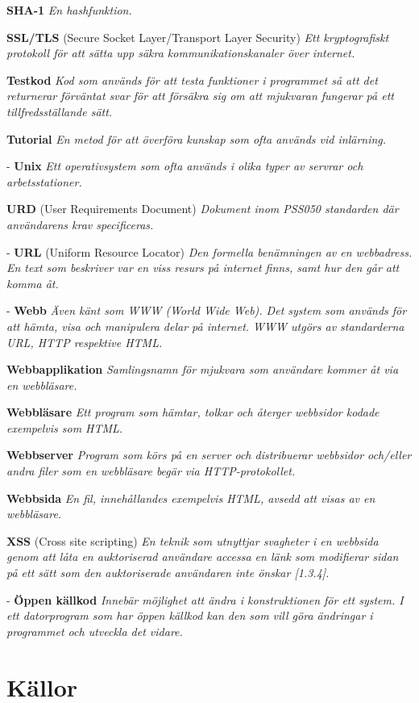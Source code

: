 \documentclass[a4paper, twoside, 11pt, titlepage]{article}
\begin{document}
\textbf{SHA-1} \emph{En hashfunktion.}

\textbf{SSL/TLS} (Secure Socket Layer/Transport Layer Security) \emph{Ett kryptografiskt protokoll för att sätta upp säkra kommunikationskanaler över internet.}

\textbf{Testkod} \emph{Kod som används för att testa funktioner i programmet så att det returnerar förväntat svar för att försäkra sig om att mjukvaran fungerar på ett tillfredsställande sätt.}

\textbf{Tutorial} \emph{En metod för att överföra kunskap som ofta används vid inlärning.}

- \textbf{Unix} \emph{Ett operativsystem som ofta används i olika typer av servrar och arbetsstationer.}

\textbf{URD} (User Requirements Document) \emph{Dokument inom PSS050 standarden där användarens krav specificeras.}

- \textbf{URL} (Uniform Resource Locator) \emph{Den formella benämningen av en webbadress. En text som beskriver var en viss resurs på internet finns, samt hur den går att komma åt.}

- \textbf{Webb} \emph{Även känt som WWW (World Wide Web). Det system som används för att hämta, visa och manipulera delar på internet. WWW utgörs av standarderna URL, HTTP respektive HTML.}

\textbf{Webbapplikation} \emph{Samlingsnamn för mjukvara som användare kommer åt via en webbläsare.}

\textbf{Webbläsare} \emph{Ett program som hämtar, tolkar och återger webbsidor kodade exempelvis som HTML.}

\textbf{Webbserver} \emph{Program som körs på en server och distribuerar webbsidor och/eller andra filer som en webbläsare begär via HTTP-protokollet.}

\textbf{Webbsida} \emph{En fil, innehållandes exempelvis HTML, avsedd att visas av en webbläsare.}

\textbf{XSS} (Cross site scripting) \emph{En teknik som utnyttjar svagheter i en webbsida genom att låta en auktoriserad användare accessa en länk som modifierar sidan på ett sätt som den auktoriserade användaren inte önskar [1.3.4].}

- \textbf{Öppen källkod} \emph{Innebär möjlighet att ändra i konstruktionen för ett system. I ett datorprogram som har öppen källkod kan den som vill göra ändringar i programmet och utveckla det vidare.}

\clearpage
\section{Källor}
\end{document}
